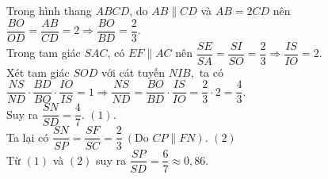 \begin{ex}
{		Trong hình thang $ABCD$, do  $AB\parallel CD$ và $AB=2CD$ nên
		$\dfrac{BO}{OD}=\dfrac{AB}{CD}=2\Rightarrow \dfrac{BO}{BD}=\dfrac{2}{3}$.\\ 
		Trong tam giác  $SAC$, có $EF\parallel AC$ nên $\dfrac{SE}{SA}=\dfrac{SI}{SO}=\dfrac{2}{3}\Rightarrow \dfrac{IS}{IO}=2$.\\
		Xét tam giác $SOD$ với cát  tuyến $NIB,$ ta có
		$\dfrac{NS}{ND}\cdot\dfrac{BD}{BO}\cdot\dfrac{IO}{IS}=1\Rightarrow \dfrac{NS}{ND}=\dfrac{BO}{BD}\cdot\dfrac{IS}{IO}=\dfrac{2}{3}\cdot2=\dfrac{4}{3}$.\\ 
		Suy ra $\dfrac{SN}{SD}=\dfrac{4}{7}$. $\left(1\right)$.\\ 
		Ta lại  có $\dfrac{SN}{SP}=\dfrac{SF}{SC}=\dfrac{2}{3}\ \left(\text{Do } CP\parallel FN\right)$. $\left(2\right)$\\
	Từ $\left(1\right)$ và  $\left(2\right)$ suy ra $\dfrac{SP}{SD}=\dfrac{6}{7}\approx 0{,}86$.}
\end{ex}



